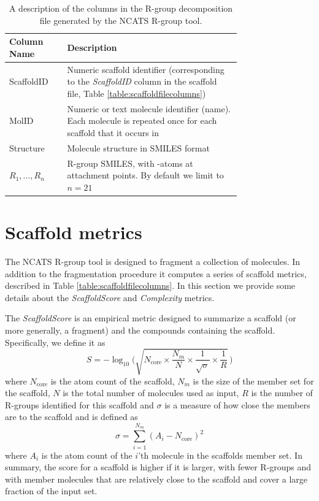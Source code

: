 \documentclass[11pt,letterpaper]{article}
\begin{document}
\begin{table}[h]
  \centering
  \begin{tabular}[h]{lp{0.75\linewidth}}
    \hline
    \textbf{Column Name} & \textbf{Description} \\
    \hline
    ScaffoldID & Numeric scaffold identifier (corresponding to
  the {\it ScaffoldID} column in the scaffold file, Table \ref{table:scaffoldfilecolumns}) \\
  MolID & Numeric or text molecule identifier (name). Each molecule is
  repeated once for each scaffold that it occurs in \\
  Structure & Molecule structure in SMILES format \\
  $R_1, \ldots, R_n$ & R-group SMILES, with \*-atoms at attachment
  points. By default we limit to $n = 21$ \\
  \hline
  \end{tabular}
  \caption{A description of the columns in the R-group decomposition
    file generated by the NCATS R-group tool.}
\end{table}


\newpage

\section{Scaffold metrics}
\label{sec:scaffold-metrics}

The NCATS R-group tool is designed to fragment a collection of
molecules. In addition to the fragmentation procedure it computes a
series of scaffold metrics, described in Table
\ref{table:scaffoldfilecolumns}. In this section we provide some
details about the \textit{ScaffoldScore} and \textit{Complexity}
metrics.

The \textit{ScaffoldScore} is an empirical metric designed to
summarize a scaffold (or more generally, a fragment) and the compounds
containing the scaffold. Specifically, we define it as  
\begin{equation}
  \label{eq:1}
  S = -\log_{10} \Bigg( \sqrt{ N_{\mathrm{core}} \times \frac{N_{m}}{N} \times
    \frac{1}{\sqrt{\sigma}} \times \frac{1}{R} }  \, \Bigg)
\end{equation}
where $N_{\mathrm{core}}$ is the atom count of the scaffold,
$N_{m}$ is the size of the member set for the scaffold,
$N$ is the total number of molecules used as input, $R$ is the number
of R-groups identified for this scaffold and $\sigma$ is a measure of
how close the members are to the scaffold and is defined as
\begin{equation}
  \label{eq:2}
  \sigma = \sum_{i=1}^{N_m} ( A_i - N_{\mathrm{core}} )^2
\end{equation}
where $A_i$ is the atom count of the $i$'th molecule in the scaffolds
member set.  In summary, the score for a scaffold is higher if it is
larger, with fewer R-groups and with member molecules that are
relatively close to the scaffold and cover a large fraction of the
input set.
\end{document}

